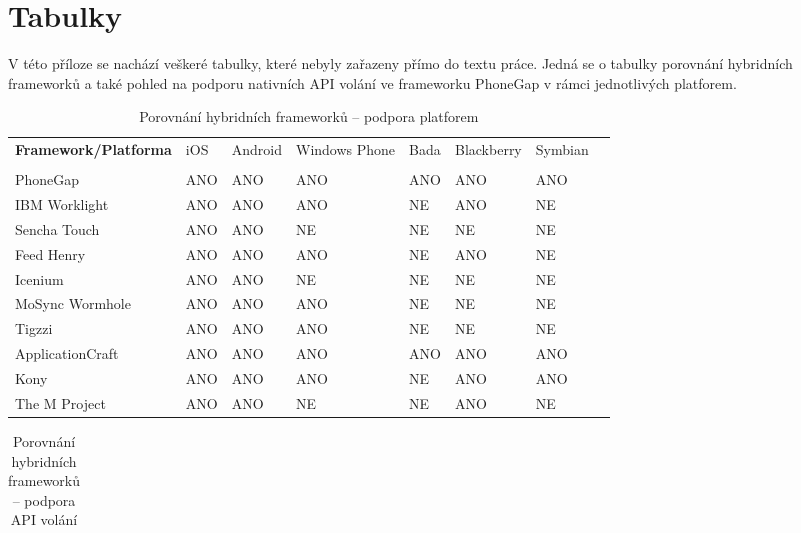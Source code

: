 \documentclass[thesis=B,czech]{FITthesis}[2012/06/26]
\begin{document}
\chapter{Tabulky}
V této příloze se nachází veškeré tabulky, které nebyly zařazeny přímo do textu práce. Jedná se o tabulky porovnání hybridních frameworků a také pohled na podporu nativních API volání ve frameworku PhoneGap v rámci jednotlivých platforem.
\begin{landscape}
\begin{table}
\caption[Porovnání hybridních frameworků – podpora platforem]{Porovnání hybridních frameworků – podpora platforem}
	\label{tab:HybridFrameworksPlatformComparsion}
\begin{tabularx}{21cm}{|p{4.5cm}|X|X|X|X|X|X|X|}
\hline

	\vspace{5 mm} \textbf{Framework/Platforma} & iOS & Android & Windows Phone & Bada & Blackberry & Symbian \\
	\tabularnewline \hline \hline
	PhoneGap & ANO & ANO & ANO & ANO & ANO & ANO \\
	IBM Worklight & ANO & ANO & ANO & NE & ANO & NE \\
	Sencha Touch & ANO & ANO & NE & NE & NE & NE \\
	Feed Henry & ANO & ANO & ANO & NE & ANO & NE \\
	Icenium & ANO & ANO & NE & NE & NE & NE \\
	MoSync Wormhole & ANO & ANO & ANO & NE & NE & NE \\
	Tigzzi & ANO & ANO & ANO & NE & NE & NE \\
	ApplicationCraft & ANO & ANO & ANO & ANO & ANO & ANO  \\
	Kony & ANO & ANO & ANO & NE & ANO & ANO \\
	The M Project & ANO & ANO & NE & NE & ANO & NE \\
    \hline
    \end{tabularx}
\end{table}

\begin{table}
\caption[Porovnání hybridních frameworků – podpora API volání]{Porovnání hybridních frameworků – podpora API volání}
	\label{tab:HybridFrameworksAPIComparsion}
\begin{tabularx}{21cm}{|p{3.5cm}|X|X|X|X|X|X|X|X|X|X|X|X|}
\hline


\end{tabularx}
\end{table}
\end{landscape}
\end{document}
